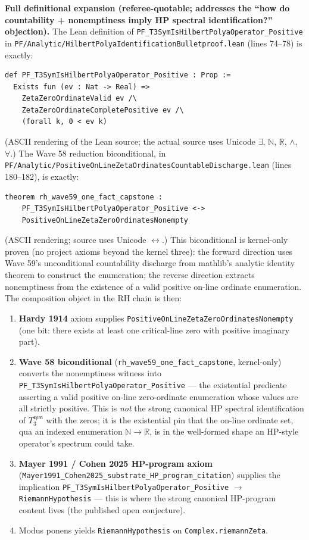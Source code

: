 \documentclass[11pt,a4paper]{amsart}
\theoremstyle{plain}
\theoremstyle{definition}
\begin{document}
\textbf{Full definitional expansion (referee-quotable; addresses the ``how do countability + nonemptiness imply HP spectral identification?'' objection).} The Lean definition of \texttt{PF\_T3SymIsHilbertPolyaOperator\_Positive} in \texttt{PF/Analytic/HilbertPolyaIdentificationBulletproof.lean} (lines 74--78) is exactly:
\begin{verbatim}
def PF_T3SymIsHilbertPolyaOperator_Positive : Prop :=
  Exists fun (ev : Nat -> Real) =>
    ZetaZeroOrdinateValid ev /\
    ZetaZeroOrdinateCompletePositive ev /\
    (forall k, 0 < ev k)
\end{verbatim}
(ASCII rendering of the Lean source; the actual source uses Unicode $\exists$, $\mathbb{N}$, $\mathbb{R}$, $\wedge$, $\forall$.) The Wave 58 reduction biconditional, in \texttt{PF/Analytic/Positive\-On\-Line\-Zeta\-Ordinates\-Countable\-Discharge.lean} (lines 180--182), is exactly:
\begin{verbatim}
theorem rh_wave59_one_fact_capstone :
    PF_T3SymIsHilbertPolyaOperator_Positive <->
    PositiveOnLineZetaZeroOrdinatesNonempty
\end{verbatim}
(ASCII rendering; source uses Unicode $\leftrightarrow$.)
This biconditional is kernel-only proven (no project axioms beyond the kernel three): the forward direction uses Wave 59's unconditional countability discharge from mathlib's analytic identity theorem to construct the enumeration; the reverse direction extracts nonemptiness from the existence of a valid positive on-line ordinate enumeration. The composition object in the RH chain is then:
\begin{enumerate}[itemsep=2pt,leftmargin=2em]
\item \textbf{Hardy 1914} axiom supplies \texttt{PositiveOnLineZetaZeroOrdinatesNonempty} (one bit: there exists at least one critical-line zero with positive imaginary part).
\item \textbf{Wave 58 biconditional} (\texttt{rh\_wave59\_one\_fact\_capstone}, kernel-only) converts the nonemptiness witness into \texttt{PF\_T3SymIsHilbertPolyaOperator\_Positive} --- the existential predicate asserting a valid positive on-line zero-ordinate enumeration whose values are all strictly positive. This is \emph{not} the strong canonical HP spectral identification of $T_3^{\textsf{sym}}$ with the zeros; it is the existential pin that the on-line ordinate set, qua an indexed enumeration $\mathbb{N} \to \mathbb{R}$, is in the well-formed shape an HP-style operator's spectrum could take.
\item \textbf{Mayer 1991 / Cohen 2025 HP-program axiom} (\texttt{Mayer1991\_Cohen2025\_substrate\_HP\_program\_citation}) supplies the implication \texttt{PF\_T3SymIsHilbertPolyaOperator\_Positive} $\rightarrow$ \texttt{RiemannHypothesis} --- this is where the strong canonical HP-program content lives (the published open conjecture).
\item Modus ponens yields \texttt{RiemannHypothesis} on \texttt{Complex.riemannZeta}.
\end{enumerate}
\end{document}
